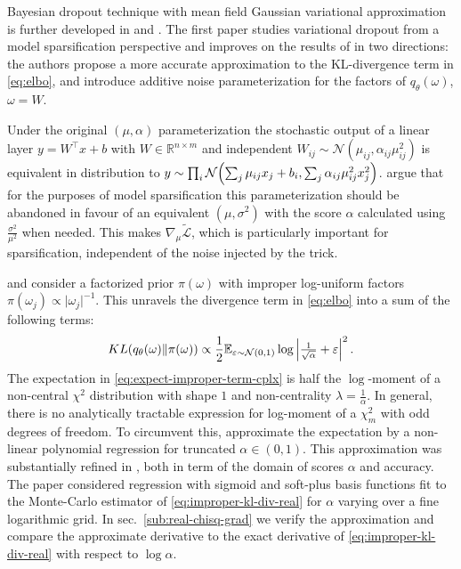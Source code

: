 \documentclass[a4paper,10pt]{article}
\begin{document}
Bayesian dropout technique with mean field Gaussian variational approximation is further
developed in \cite{molchanov_variational_2017} and \cite{kharitonov_variational_2018}. The
first paper studies variational dropout from a model sparsification perspective and improves
on the results of \cite{kingma_variational_2015} in two directions: the authors propose a
more accurate approximation to the KL-divergence term in \eqref{eq:elbo}, and introduce
additive noise parameterization for the factors of $q_\theta(\omega)$, $\omega = W$.

Under the original $(\mu, \alpha)$ parameterization the stochastic output of a linear
layer $
  y = W^\top x + b
$ with $
  W \in \mathbb{R}^{n\times m}
$ and independent $
  W_{ij} \sim \mathcal{N}(\mu_{ij}, \alpha_{ij} \mu_{ij}^2)
$ is equivalent in distribution to $
  y \sim \prod_i \mathcal{N}\Bigl(
      \sum_j \mu_{ij} x_j + b_i,
      \sum_j \alpha_{ij} \mu_{ij}^2 x_j^2
  \Bigr)
$. \cite{molchanov_variational_2017} argue that for the purposes of model sparsification
this parameterization should be abandoned in favour of an equivalent $(\mu, \sigma^2)$ with
the score $\alpha$ calculated using $\tfrac{\sigma^2}{\mu^2}$ when needed. This makes $
  \nabla_\mu \tilde{\mathcal{L}}
$, which is particularly important for sparsification, independent of the noise injected
by the trick.

\cite{kingma_variational_2015} and \cite{molchanov_variational_2017} consider a factorized
prior $\pi(\omega)$ with improper log-uniform factors $
  \pi(\omega_j) \propto \lvert \omega_j \rvert^{-1}
$. This unravels the divergence term in \eqref{eq:elbo} into a sum of the following terms:
\begin{equation} \label{eq:improper-kl-div-real}
  KL(q_\theta(\omega) \| \pi(\omega))
    \propto
      \frac12 \mathbb{E}_{\varepsilon \sim \mathcal{N}(0, 1)}
        \log{\Bigl\lvert \tfrac1{\sqrt{\alpha}} + \varepsilon \Bigr\rvert^2}
  \,.
\end{equation}
The expectation in \eqref{eq:expect-improper-term-cplx} is half the $\log$-moment of a non-central
$\chi^2$ distribution with shape $1$ and non-centrality $\lambda = \tfrac1{\alpha}$. In general,
there is no analytically tractable expression for log-moment of a $\chi^2_m$ with odd degrees
of freedom. To circumvent this, \cite{kingma_variational_2015} approximate the expectation by
a non-linear polynomial regression for truncated $\alpha \in (0, 1)$. This approximation was
substantially refined in \cite{molchanov_variational_2017}, both in term of the domain of scores
$\alpha$ and accuracy. The paper considered regression with sigmoid and soft-plus basis functions
fit to the Monte-Carlo estimator of \eqref{eq:improper-kl-div-real} for $\alpha$ varying over
a fine logarithmic grid. In sec.~\ref{sub:real-chisq-grad} we verify the approximation and
compare the approximate derivative to the exact derivative of \eqref{eq:improper-kl-div-real}
with respect to $\log \alpha$.
\end{document}

